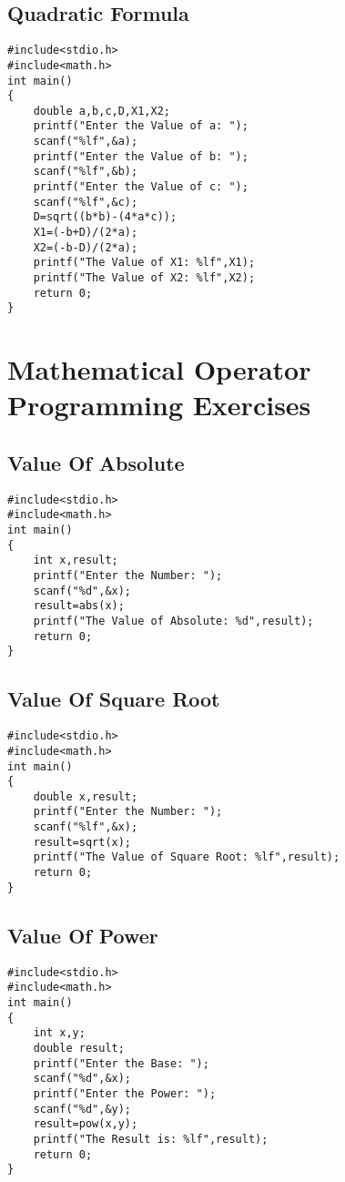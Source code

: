 \documentclass[a4paper,14pt]{article}
\begin{document}
\subsection{Quadratic Formula}
\vspace{0.5cm}
\begin{lstlisting}[caption={Quadratic Formula}]
#include<stdio.h>
#include<math.h>
int main()
{
    double a,b,c,D,X1,X2;
    printf("Enter the Value of a: ");
    scanf("%lf",&a);
    printf("Enter the Value of b: ");
    scanf("%lf",&b);
    printf("Enter the Value of c: ");
    scanf("%lf",&c);
    D=sqrt((b*b)-(4*a*c));
    X1=(-b+D)/(2*a);
    X2=(-b-D)/(2*a);
    printf("The Value of X1: %lf",X1);
    printf("The Value of X2: %lf",X2);
    return 0;
}
\end{lstlisting}
\newpage


\section{Mathematical Operator Programming Exercises}


\subsection{Value Of Absolute}
\vspace{0.5cm}
\begin{lstlisting}[caption={Value Of Absolute}]
#include<stdio.h>
#include<math.h>
int main()
{
    int x,result;
    printf("Enter the Number: ");
    scanf("%d",&x);
    result=abs(x);
    printf("The Value of Absolute: %d",result);
    return 0;
}
\end{lstlisting}
\newpage

\subsection{Value Of Square Root}
\vspace{0.5cm}
\begin{lstlisting}[caption={Value Of Square Root}]
#include<stdio.h>
#include<math.h>
int main()
{
    double x,result;
    printf("Enter the Number: ");
    scanf("%lf",&x);
    result=sqrt(x);
    printf("The Value of Square Root: %lf",result);
    return 0;
}
\end{lstlisting}
\newpage

\subsection{Value Of Power}
\vspace{0.5cm}
\begin{lstlisting}[caption={Value Of Power}]
#include<stdio.h>
#include<math.h>
int main()
{
    int x,y;
    double result;
    printf("Enter the Base: ");
    scanf("%d",&x);
    printf("Enter the Power: ");
    scanf("%d",&y);
    result=pow(x,y);
    printf("The Result is: %lf",result);
    return 0;
}
\end{lstlisting}
\newpage
\end{document}
